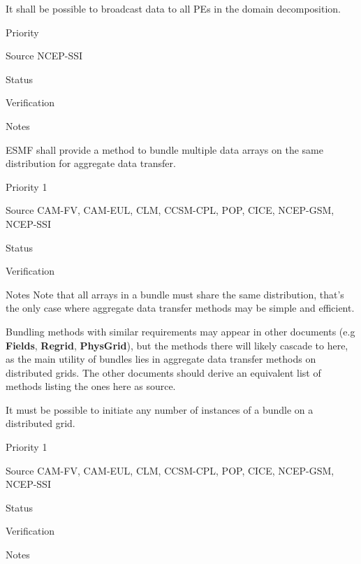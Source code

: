 
It shall be possible to broadcast data to all PEs in the domain decomposition.

\begin{reqlist}
\item[Priority] 
\item[Source] NCEP-SSI
\item[Status]
\item[Verification]
\item[Notes] 
\end{reqlist}


ESMF shall provide a method to bundle multiple data arrays on the same
distribution for aggregate data transfer.

\begin{reqlist}
\item[Priority] 1
\item[Source] CAM-FV, CAM-EUL, CLM, CCSM-CPL, POP, CICE, NCEP-GSM, NCEP-SSI
\item[Status]
\item[Verification]
\item[Notes] Note that all arrays in a bundle must share the same
  distribution, that's the only case where aggregate data transfer
  methods may be simple and efficient.
  
  Bundling methods with similar requirements may appear in other
  documents (e.g \textbf{Fields}, \textbf{Regrid}, \textbf{PhysGrid}),
  but the methods there will likely cascade to here, as the main
  utility of bundles lies in aggregate data transfer methods on
  distributed grids. The other documents should derive an equivalent
  list of methods listing the ones here as source.
\end{reqlist}


It must be possible to initiate any number of instances of a bundle on
a distributed grid.

\begin{reqlist}
\item[Priority] 1
\item[Source] CAM-FV, CAM-EUL, CLM, CCSM-CPL, POP, CICE, NCEP-GSM, NCEP-SSI
\item[Status]
\item[Verification]
\item[Notes]
\end{reqlist}


